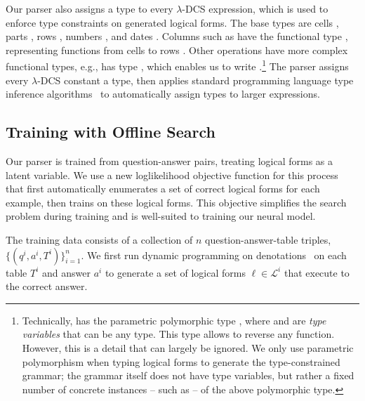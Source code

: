 Our parser also assigns a type to every $\lambda$-DCS expression, which is used 
to enforce type constraints on generated logical forms.
The base types are cells , parts , rows , numbers 
, and dates .
Columns such as  have the functional type , 
representing functions from cells  to rows .
Other operations have more complex functional types, e.g.,  has 
type
, which enables us to write .\footnote{Technically,  has the parametric polymorphic 
type \func{\func{\alpha}{\beta}}{\func{\beta}{\alpha}}, where \type{\alpha} and 
\type{\beta} are \emph{type variables} that can be any type. This type allows 
 to reverse any function. However, this is a detail that can 
largely be ignored. We only use parametric polymorphism when typing logical 
forms to generate the type-constrained grammar; the grammar itself does not 
have 
type variables, but rather a fixed number of concrete instances -- such as 
 -- of the above polymorphic type.}
The parser assigns every $\lambda$-DCS constant a type, then applies standard 
programming language type inference algorithms~\citep{Pierce2002TypesAP} to 
automatically assign types to larger expressions.

\subsection{Training with Offline Search}
\label{sec:nnsp_training}
Our parser is trained from question-answer pairs, treating logical forms as a 
latent variable. We use a new loglikelihood objective function for this process 
that first automatically enumerates a set of correct logical forms for each 
example, then trains on these logical forms. This objective simplifies the 
search problem during training and is well-suited to training our neural model.

The training data consists of a collection of $n$ question-answer-table 
triples, 
$\{(q^i, a^i, T^i)\}_{i=1}^n$. We first run dynamic programming on
denotations~\citep{pasupat2016inferring} on each table $T^i$ and answer $a^i$ to generate a 
set of 
logical forms $\ell \in \mathcal{L}^i$ that execute to the correct answer.

